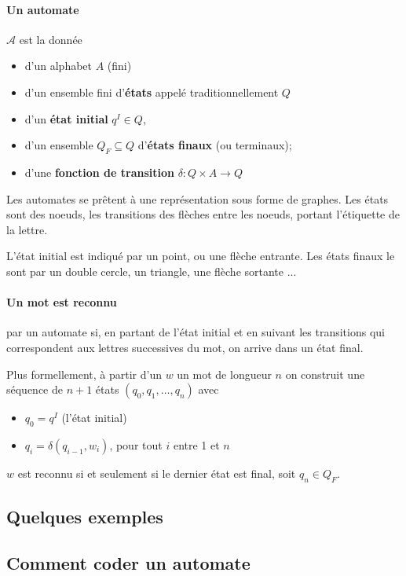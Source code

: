 \documentclass[10pt,twoside]{article}
\begin{document}
\paragraph{Un automate} $\mathcal{A}$ est la donnée
\begin{itemize}
\item d'un alphabet $A$ (fini)
\item d'un ensemble fini d'\textbf{états} appelé traditionnellement $Q$
\item d'un \textbf{état initial} $q^I \in Q$,
\item d'un ensemble $Q_F \subseteq Q$ d'\textbf{états finaux} (ou terminaux);
\item d'une \textbf{fonction de transition} $\delta : Q \times A \rightarrow Q$
\end{itemize}


Les automates se prêtent à une représentation sous forme de
graphes. Les états sont des noeuds, les transitions des flèches entre
les noeuds, portant l'étiquette de la lettre.

L'état initial est indiqué par un point, ou une flèche entrante. 
Les états finaux
le sont par un double cercle, un triangle, une flèche sortante ...

\paragraph{Un mot est reconnu} par un automate si, en partant de l'état initial
et en suivant les transitions qui correspondent aux lettres successives du mot,
on arrive dans un état final.

Plus formellement, à partir d'un $w$ un mot de longueur $n$ on construit 
une séquence de $n+1$ états $(q_0, q_1, \ldots, q_n)$ avec
\begin{itemize}
\item $q_0 = q^I$ (l'état initial)
\item $q_i = \delta(q_{i-1}, w_i)$, pour tout $i$ entre 1 et $n$
\end{itemize}
$w$ est reconnu si et seulement si le dernier état est final, soit
$q_n \in Q_F$.


\subsection{Quelques exemples}



\subsection{Comment coder un automate}
\end{document}
